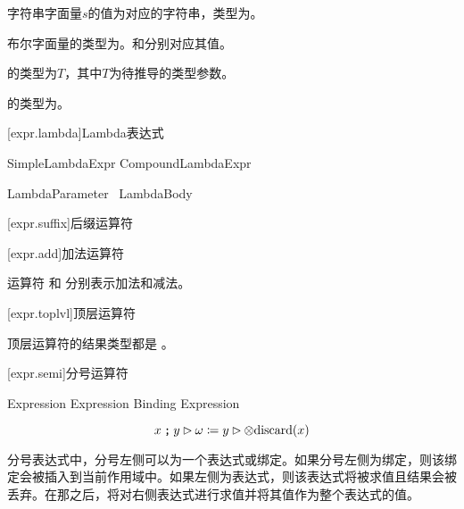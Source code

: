 \pnum
字符串字面量$s$的值为对应的字符串，类型为。

\pnum
布尔字面量的类型为。和分别对应其值。

\pnum
{}的类型为$T$，其中$T$为待推导的类型参数。

\pnum
\tcode{()}的类型为。

[expr.lambda]{Lambda表达式}

\begin{bnf}
 \br
    SimpleLambdaExpr \br
    CompoundLambdaExpr
\end{bnf}

\begin{bnf}
 \br
    LambdaParameter\bnfq\ \terminal{=>} LambdaBody
\end{bnf}

\begin{bnf}
 \br
\end{bnf}

[expr.suffix]{后缀运算符}

[expr.add]{加法运算符}

\pnum
运算符 \tcode{+} 和 \tcode{-} 分别表示加法和减法。

[expr.toplvl]{顶层运算符}

\pnum
顶层运算符的结果类型都是 。

[expr.semi]{分号运算符}

\begin{bnf}
\br
    Expression \terminal{;} Expression\br
    Binding \terminal{;} Expression\br
\end{bnf}

$$ x \mathbin{\texttt{;}} y \rhd \omega \coloneqq y \rhd \otimes \mathrm{discard}(x)$$

\pnum
分号表达式中，分号左侧可以为一个表达式或绑定。如果分号左侧为绑定，则该绑定会被插入到当前作用域中。如果左侧为表达式，则该表达式将被求值且结果会被丢弃。在那之后，将对右侧表达式进行求值并将其值作为整个表达式的值。